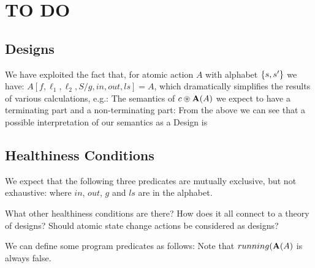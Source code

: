 \section{TO DO}\label{ha:TO-DO}


\subsection{Designs}

We have exploited the fact that,
for atomic action $A$ with alphabet $\{{s,s'}\}$ we have:
$A[f,\ell_1,\ell_2,S/g,in,out,ls] = A$,
which dramatically simplifies the results of various calculations, e.g.:
The semantics of $c \circledast \mathbf{A}(A)$ we expect to have a terminating part
and a non-terminating part:
From the above we can see that a possible interpretation of our semantics as a
Design is

\subsection{Healthiness Conditions}

We expect that the following three predicates
are mutually exclusive, but not exhaustive:
where $in$, $out$, $g$ and $ls$ are in the alphabet.

What other healthiness conditions are there?
How does it all connect to a theory of designs?
Should atomic state change actions be considered as designs?

We can define some program predicates as follows:
Note that $running(\mathbf{A}(A)$ is always false.

